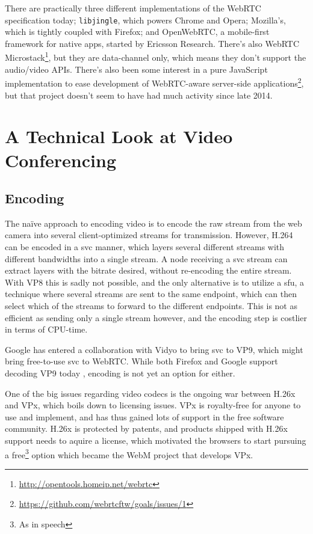 There are practically three different implementations of the WebRTC specification today; \texttt{libjingle}, which powers Chrome and Opera; Mozilla's, which is tightly coupled with Firefox; and OpenWebRTC, a mobile-first framework for native apps, started by Ericsson Research. There's also WebRTC Microstack\footnote{\url{http://opentools.homeip.net/webrtc}}, but they are data-channel only, which means they don't support the audio/video APIs. There's also been some interest in a pure JavaScript implementation to ease development of WebRTC-aware server-side applications\footnote{\url{https://github.com/webrtcftw/goals/issues/1}}, but that project doesn't seem to have had much activity since late 2014.


\section{A Technical Look at Video Conferencing}

\subsection{Encoding}

The naïve approach to encoding video is to encode the raw stream from the web camera into several client-optimized streams for transmission. However, H.264 can be encoded in a \gls{svc} manner, which layers several different streams with different bandwidths into a single stream. A node receiving a \gls{svc} stream can extract layers with the bitrate desired, without re-encoding the entire stream. With VP8 this is sadly not possible, and the only alternative is to utilize a \gls{sfu}, a technique where several streams are sent to the same endpoint, which can then select which of the streams to forward to the different endpoints. This is not as efficient as sending only a single stream however, and the encoding step is costlier in terms of CPU-time.

Google has entered a collaboration with Vidyo \cite{vp9-vidyo} to bring \gls{svc} to VP9, which might bring free-to-use \gls{svc} to WebRTC. While both Firefox and Google support decoding VP9 today \cite{vp9-support}, encoding is not yet an option for either.

One of the big issues regarding video codecs is the ongoing war between H.26x and VPx, which boils down to licensing issues. VPx is royalty-free for anyone to use and implement, and has thus gained lots of support in the free software community. H.26x is protected by patents, and products shipped with H.26x support needs to aquire a license, which motivated the browsers to start pursuing a free\footnote{As in speech} option which became the WebM project that develops VPx.


